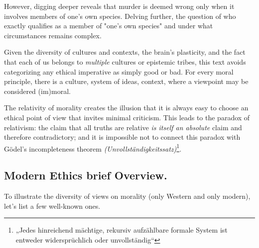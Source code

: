 \documentclass[11pt,a4]{article}
\begin{document}
    However, digging deeper reveals that murder is deemed wrong only when it involves members of one's own species.
    Delving further, the question of who exactly qualifies as a member of "one's own species" and under what circumstances remains complex.

    Given the diversity of cultures and contexts, the brain's plasticity, and the fact that each of us belongs to \textit{multiple} cultures or epistemic tribes, this text avoids categorizing any ethical imperative as simply good or bad. For every moral principle, there is a culture, system of ideas, context, where a viewpoint may be considered (im)moral.


    The relativity of morality creates the illusion that it is always
    easy to choose an ethical point of view that invites minimal criticism.
    This leads to the paradox of relativism\cite{Meiland1980-ho}: the claim
    that all truths
    are relative \textit{is itself an absolute} claim and therefore contradictory;
    and it is impossible not to connect this paradox with Gödel's
    incompleteness theorem \textit{(Unvollständigkeitssatz)}\footnote{„Jedes
    hinreichend mächtige, rekursiv aufzählbare formale System ist
    entweder widersprüchlich oder unvollständig“}.




\subsection{Modern Ethics brief Overview.}



        To illustrate the diversity of views on morality (only Western and only modern), let's list a few well-known ones.
\end{document}
